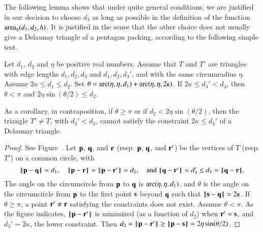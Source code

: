 The following lemma shows that under quite general
conditions, we are justified in our decision to choose $d_3$ as long
as possible in the definition of the function ${\operatorname{area}}_\eta(d_1,d_2,h)$.  It
is justified in the sense that the other choice does not usually give
a Delaunay triangle of a pentagon packing, according to the following
simple test.

\begin{lemma}  
  Let $d_1$, $d_2$ and $\eta$ be positive real numbers.  Assume that
  $T$ and $T'$ are triangles with edge lengths $d_1,d_2,d_3$ and
  $d_1,d_2,d_3'$, and with the same circumradius $\eta$. Assume
  $2\kappa\le d_1\le d_2$.  Set $\theta =
  \operatorname{arc}(\eta,\eta,d_1)+\operatorname{arc}(\eta,\eta,2\kappa)$.  If $2\kappa \le d_3'
  < d_3$, then $\theta < \pi$ and $2\eta\sin(\theta/2) \le d_2$.
\end{lemma}

As a corollary, 
in contraposition, if $\theta\ge\pi$ or if $d_2 < 2\eta\sin(\theta/2)$,
then the triangle $T'\ne T$, with $d_3' < d_3$,
cannot satisfy the constraint $2\kappa\le d_3'$ of a  Delaunay triangle.


\begin{proof} 
  See Figure~.  Let ${\mathbf p}$, ${\mathbf q}$, and ${\mathbf r}$ (resp. ${\mathbf p}$,
  ${\mathbf q}$, and ${\mathbf r}'$) be the vertices of $T$ (resp. $T'$) on a common
  circle, with
\[
\norm{\p}{\q} =d_1, 
\quad\norm{\p}{\r}=\norm{\p}{\r'}=d_2, \quad\text{and } 
\norm{\q}{\r'} = d_3' \le d_3=\norm{\q}{\r}.
\]
The angle on the circumcircle from ${\mathbf p}$ to ${\mathbf q}$ is
$\operatorname{arc}(\eta,\eta,d_1)$, and $\theta$ is the angle on the circumcircle
from ${\mathbf p}$ to the first point ${\mathbf s}$ beyond ${\mathbf q}$ such that
$\norm{\s}{\q}=2\kappa$.  If $\theta\ge\pi$, a point ${\mathbf r}'\ne {\mathbf r}$
satisfying the constraints does not exist.  Assume $\theta < \pi$.  As
the figure indicates, $\norm{\p}{\r'}$ is minimized (as a function of
$d_2$) when ${\mathbf r}'={\mathbf s}$, and $d_3' = 2\kappa$, the lower constraint.  Then $d_2 =
\norm{\p}{\r'}\ge \norm{\p}{\s}= 2\eta\sin(\theta/2)$.
\end{proof}



